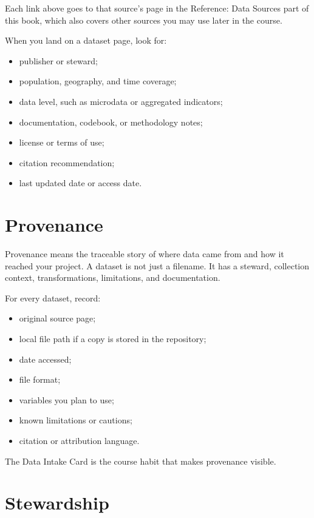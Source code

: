 \documentclass[
  letterpaper,
  DIV=11,
  numbers=noendperiod,
  oneside]{scrreprt}
\providecommand{\tightlist}{%
  \setlength{\itemsep}{0pt}\setlength{\parskip}{0pt}}
\begin{document}
Each link above goes to that source's page in the Reference: Data
Sources part of this book, which also covers other sources you may use
later in the course.

When you land on a dataset page, look for:

\begin{itemize}
\tightlist
\item
  publisher or steward;
\item
  population, geography, and time coverage;
\item
  data level, such as microdata or aggregated indicators;
\item
  documentation, codebook, or methodology notes;
\item
  license or terms of use;
\item
  citation recommendation;
\item
  last updated date or access date.
\end{itemize}

\section*{Provenance}\label{provenance}


Provenance means the traceable story of where data came from and how it
reached your project. A dataset is not just a filename. It has a
steward, collection context, transformations, limitations, and
documentation.

For every dataset, record:

\begin{itemize}
\tightlist
\item
  original source page;
\item
  local file path if a copy is stored in the repository;
\item
  date accessed;
\item
  file format;
\item
  variables you plan to use;
\item
  known limitations or cautions;
\item
  citation or attribution language.
\end{itemize}

The Data Intake Card is the course habit that makes provenance visible.

\section*{Stewardship}\label{stewardship}
\end{document}
